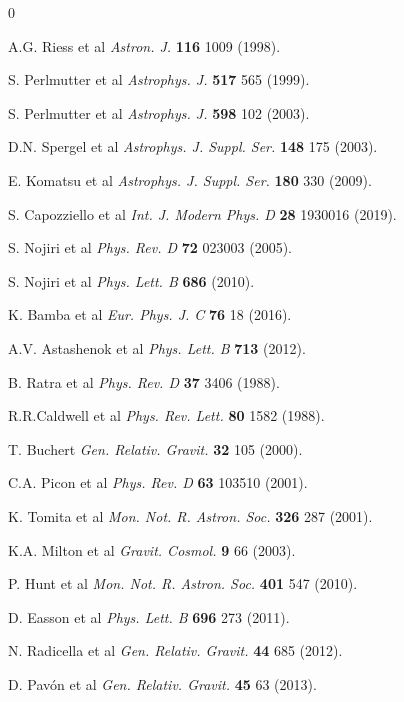 \documentclass[aps,prd,showpacs,nofootinbib,floats,floatfix,preprintnumbers,groupedaddress,twocolumn]{revtex4-1}
\begin{document}
    
\begin{thebibliography}{0}

A.G. Riess et al \textit{Astron. J.} \textbf{116} 1009 (1998).

S. Perlmutter et al \textit{Astrophys. J.} \textbf{517} 565 (1999).

S. Perlmutter et al \textit{Astrophys. J.} \textbf{598} 102 (2003).

D.N. Spergel et al \textit{Astrophys. J. Suppl. Ser.} \textbf{148} 175 (2003).

E. Komatsu et al \textit{Astrophys. J. Suppl. Ser.} \textbf{180} 330 (2009).

S. Capozziello et al \textit{Int. J. Modern Phys. D} \textbf{28} 1930016 (2019). 

S. Nojiri et al \textit{Phys. Rev. D} \textbf{72} 023003 (2005).

S. Nojiri et al \textit{Phys. Lett. B} \textbf{686} (2010).

K. Bamba et al \textit{Eur. Phys. J. C} \textbf{76} 18 (2016).

A.V. Astashenok et al \textit{Phys. Lett. B} \textbf{713} (2012). 

B. Ratra et al \textit{Phys. Rev. D} \textbf{37} 3406 (1988).

R.R.Caldwell et al \textit{Phys. Rev. Lett.} \textbf{80} 1582 (1988).

T. Buchert \textit{Gen. Relativ. Gravit.} \textbf{32} 105 (2000).

C.A. Picon et al \textit{Phys. Rev. D} \textbf{63} 103510 (2001).

K. Tomita et al \textit{Mon. Not. R. Astron. Soc.} \textbf{326} 287 (2001).

K.A. Milton et al \textit{Gravit. Cosmol.} \textbf{9} 66 (2003).

P. Hunt et al \textit{Mon. Not. R. Astron. Soc.} \textbf{401} 547 (2010).

D. Easson et al \textit{Phys. Lett. B} \textbf{696} 273 (2011).

N. Radicella et al \textit{Gen. Relativ. Gravit.} \textbf{44} 685 (2012).

D. Pavón et al \textit{Gen. Relativ. Gravit.} \textbf{45} 63 (2013).


\end{thebibliography}
\end{document}

